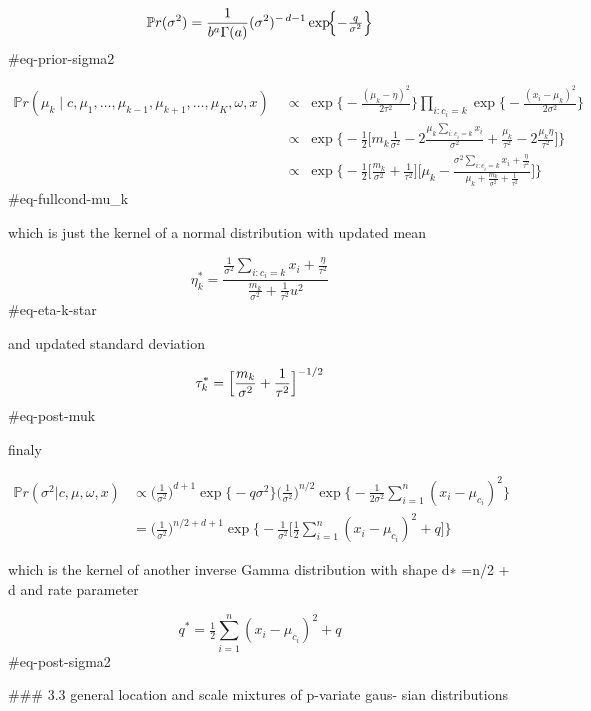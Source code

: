$$
\mathbb{P}r(\sigma^2)
=\frac{1}{b^a\Gamma(a)}
(\sigma^2)^{-\,d-1}
\exp\!\Bigl\{-\tfrac{q}{\sigma^2}\Bigr\}
$$ {#eq-prior-sigma2}



$$
\begin{aligned}
\mathbb{P}r(\mu_k \mid c, \mu_1, \ldots, \mu_{k-1}, \mu_{k+1}, \ldots, \mu_K, \omega, x) 
& \;\propto\;
\exp\Biggl\{
-\frac{(\mu_k - \eta)^2}{2\tau^2}
\Biggr\} \prod_{i:c_i=k}
\exp\Biggl\{
-\frac{(x_i - \mu_k)^2}{2\sigma^2}
\Biggr\}
\\ & \;\propto\;
\exp\Biggl\{
-\frac{1}{2}
\Biggl[ m_k \frac{1}{\sigma^2} - 2 \frac{\mu_k \sum_{i:c_i=k} x_i}{\sigma^2} + \frac{\mu_k}{\tau^2} - 2 \frac{\mu_k\eta}{\tau^2} \Biggr] \Biggr\}
\\ & \;\propto\;
\exp\Biggl\{
-\frac{1}{2}
\Biggl[ \frac{m_k}{\sigma^2} + \frac{1}{\tau^2} \Biggr] \Biggl[ \mu_k - \frac{\sigma^2 \sum_{i:c_i=k} x_i + \frac{\eta}{\tau^2} }{\mu_k + \frac{m_k}{\sigma^2}+ \frac{1}{\tau^2}} \Biggr] \Biggr\}

\end{aligned}
$$ {#eq-fullcond-mu_k}

which is just the kernel of a normal distribution with updated mean

$$
\eta_k^* = \frac{\frac{1}{\sigma^2}\sum_{i:c_i=k} x_i + \frac{\eta}{\tau^2}}{ \frac{m_k}{\sigma^2}+ \frac{1}{\tau^2}u^2}
$$ {#eq-eta-k-star}

and updated standard deviation

$$
\tau_k^*=\Bigl[ \frac{m_k}{\sigma^2}+ \frac{1}{\tau^2} \Bigr]^{-1/2}
$$ {#eq-post-muk}

finaly 

$$
\begin{aligned}
\mathbb{P}r(\sigma^2 | c, \mu, \omega, x) 
&\propto 
\Biggl(\frac{1}{\sigma^2}\Biggr)^{d+1}
\exp\Biggl\{
− q
\sigma^2
\Biggr\}
\Biggl(\frac{1}{\sigma^2}\Biggr)^{n/2}
\exp\Biggl\{
− \frac{1}{2\sigma^2}
\sum_{i=1}^{n}(x_i − \mu_{c_i})^2
\Biggr\}
\\&=
\Biggl(\frac{1}{\sigma^2}\Biggr)^{n/2+d+1}
\exp\Biggl\{
− \frac{1}{\sigma^2}
\Biggl[ \frac{1}{2} \sum_{i=1}^{n}(x_i − \mu_{c_i})^2
+ q
\Biggr]
\Biggr\}
\end{aligned}
$$

which is the kernel of another inverse Gamma distribution with shape d∗ =n/2 + d and rate parameter

$$
q^*=\tfrac12\sum_{i=1}^n(x_i-\mu_{c_i})^2 + q
$$ {#eq-post-sigma2}

### 3.3 general location and scale mixtures of p-variate gaus-
sian distributions

